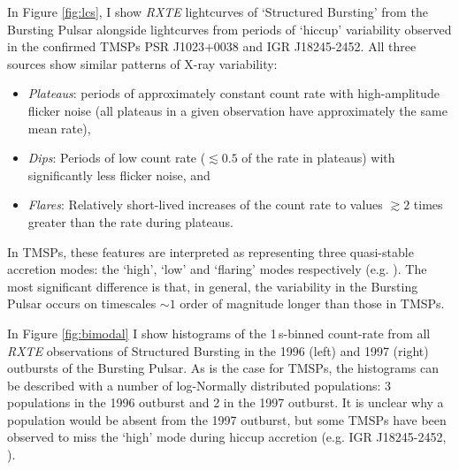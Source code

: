 \par In Figure \ref{fig:lcs}, I show \indexrxte\textit{RXTE} lightcurves of `Structured Bursting' from the Bursting Pulsar alongside lightcurves from periods of `hiccup' variability observed in the confirmed TMSPs PSR J1023+0038 and IGR J18245-2452. All three sources show similar patterns of X-ray variability:
\begin{itemize}
\item \textit{Plateaus}: periods of approximately constant count rate with high-amplitude flicker noise (all plateaus in a given observation have approximately the same mean rate),
\item \textit{Dips}: Periods of low count rate ($\lesssim0.5$ of the rate in plateaus) with significantly less flicker noise, and 
\item \textit{Flares}: Relatively short-lived increases of the count rate to values $\gtrsim2$ times greater than the rate during plateaus.
\end{itemize}
In TMSPs, these features are interpreted as representing three quasi-stable accretion modes: the `high', `low' and `flaring' modes respectively (e.g. \citealp{Bogdanov_TMSPVar}). The most significant difference is that, in general, the variability in the Bursting Pulsar occurs on timescales $\sim1$ order of magnitude longer than those in TMSPs.
\par In Figure \ref{fig:bimodal} I show histograms of the 1\,s-binned count-rate from all \indexrxte\textit{RXTE} observations of Structured Bursting in the 1996 (left) and 1997 (right) outbursts of the Bursting Pulsar. As is the case for TMSPs, the histograms can be described with a number of log-Normally distributed populations: 3 populations in the 1996 outburst and 2 in the 1997 outburst. It is unclear why a population would be absent from the 1997 outburst, but some TMSPs have been observed to miss the `high' mode during hiccup accretion (e.g. IGR J18245-2452, \citealp{Ferrigno_TMSPVar}).

